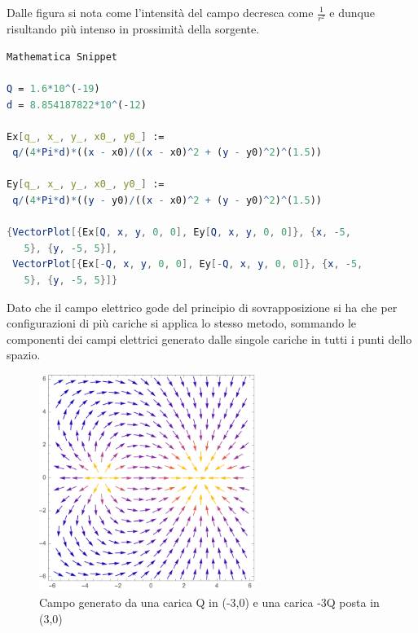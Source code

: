  Dalle figura si nota come l'intensit\`a del campo decresca come $\frac{1}{r^2}$ e dunque risultando pi\`u intenso in prossimit\`a della sorgente.
 \\
 \begin{lstlisting}[language = Mathematica]
Mathematica Snippet 

Q = 1.6*10^(-19)
d = 8.854187822*10^(-12)

Ex[q_, x_, y_, x0_, y0_] := 
 q/(4*Pi*d)*((x - x0)/((x - x0)^2 + (y - y0)^2)^(1.5))

Ey[q_, x_, y_, x0_, y0_] := 
 q/(4*Pi*d)*((y - y0)/((x - x0)^2 + (y - y0)^2)^(1.5))

{VectorPlot[{Ex[Q, x, y, 0, 0], Ey[Q, x, y, 0, 0]}, {x, -5, 
   5}, {y, -5, 5}], 
 VectorPlot[{Ex[-Q, x, y, 0, 0], Ey[-Q, x, y, 0, 0]}, {x, -5, 
   5}, {y, -5, 5}]} 
 \end{lstlisting}
 
Dato che il campo elettrico gode del principio di sovrapposizione si ha che per configurazioni di pi\`u cariche si applica lo stesso metodo, sommando le componenti dei campi elettrici generato dalle singole cariche in tutti i punti dello spazio.
\begin{figure}[!ht]
\vspace{0.1in}
\includegraphics[width = 7cm]{images/interac}	
\centering
\vspace{0.1in}
\caption{Campo generato da una carica Q in (-3,0) e una carica -3Q posta in (3,0)}
\end{figure}

\newpage 
 
